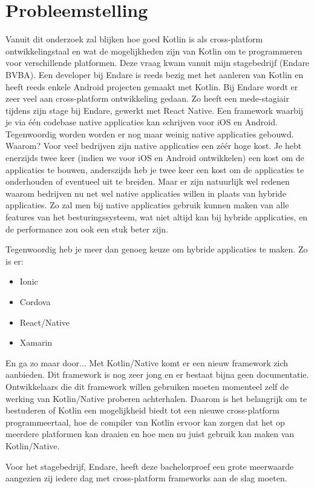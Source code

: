 \section{Probleemstelling}
\label{sec:probleemstelling}
Vanuit dit onderzoek zal blijken hoe goed Kotlin is als cross-platform ontwikkelingstaal en wat de mogelijkheden zijn van Kotlin om te programmeren voor verschillende platformen. Deze vraag kwam vanuit mijn stagebedrijf (Endare BVBA). Een developer bij Endare is reeds bezig met het aanleren van Kotlin en heeft reeds enkele Android projecten gemaakt met Kotlin. Bij Endare wordt er zeer veel aan cross-platform ontwikkeling gedaan. Zo heeft een mede-stagiair tijdens zijn stage bij Endare, gewerkt met React Native. Een framework waarbij je via één codebase native applicaties kan schrijven voor iOS en Android. Tegenwoordig worden worden er nog maar weinig native applicaties gebouwd. Waarom? Voor veel bedrijven zijn native applicaties een zéér hoge kost. Je hebt enerzijds twee keer (indien we voor iOS en Android ontwikkelen) een kost om de applicaties te bouwen, anderszijds heb je twee keer een kost om de applicaties te onderhouden of eventueel uit te breiden. Maar er zijn natuurlijk wel redenen waarom bedrijven nu net wel native applicaties willen in plaats van hybride applicaties. Zo zal men bij native applicaties gebruik kunnen maken van alle features van het besturingssysteem, wat niet altijd kan bij hybride applicaties, en de performance zou ook een stuk beter zijn. 

Tegenwoordig heb je meer dan genoeg keuze om hybride applicaties te maken. Zo is er:
\begin{itemize}
	\item Ionic
	\item Cordova
	\item React/Native
	\item Xamarin
\end{itemize}
En ga zo maar door... Met Kotlin/Native komt er een nieuw framework zich aanbieden. Dit framework is nog zeer jong en er bestaat bijna geen documentatie. Ontwikkelaars die dit framework willen gebruiken moeten momenteel zelf de werking van Kotlin/Native proberen achterhalen. Daarom is het belangrijk om te bestuderen of Kotlin een mogelijkheid biedt tot een nieuwe cross-platform programmeertaal, hoe de compiler van Kotlin ervoor kan zorgen dat het op meerdere platformen kan draaien en hoe men nu juist gebruik kan maken van Kotlin/Native. 

Voor het stagebedrijf, Endare, heeft deze bachelorproef een grote meerwaarde aangezien zij iedere dag met cross-platform frameworks aan de slag moeten.

